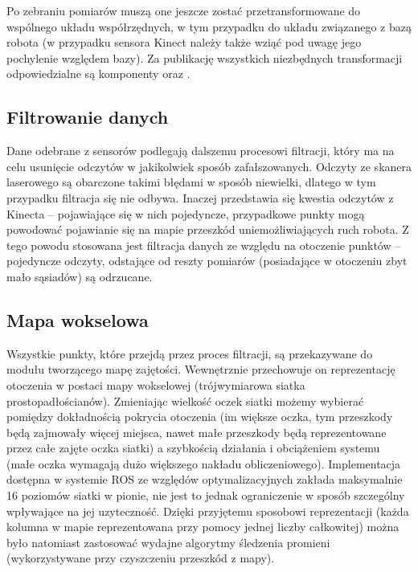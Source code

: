 Po zebraniu pomiarów muszą one jeszcze zostać przetransformowane do wspólnego
układu współrzędnych, w tym przypadku do układu związanego z bazą robota (w
przypadku sensora Kinect należy także wziąć pod uwagę jego pochylenie względem
bazy). Za publikację wszystkich niezbędnych transformacji  odpowiedzialne są
komponenty  oraz .

\subsection{Filtrowanie danych}

Dane odebrane z sensorów podlegają dalszemu procesowi filtracji, który ma na
celu usunięcie odczytów w jakikolwiek sposób zafałszowanych. Odczyty ze skanera
laserowego są obarczone takimi błędami w sposób niewielki, dlatego w tym
przypadku filtracja się nie odbywa. Inaczej przedstawia się kwestia odczytów z
Kinecta -- pojawiające się w nich pojedyncze, przypadkowe punkty mogą powodować
pojawianie się na mapie przeszkód uniemożliwiających ruch robota. Z tego powodu
stosowana jest filtracja danych ze względu na otoczenie punktów -- pojedyncze
odczyty, odstające od reszty pomiarów (posiadające w otoczeniu zbyt mało
sąsiadów) są odrzucane.

\subsection{Mapa wokselowa}

Wszystkie punkty, które przejdą przez proces filtracji, są przekazywane do
modułu tworzącego mapę zajętości. Wewnętrznie przechowuje on reprezentację
otoczenia w postaci mapy wokselowej (trójwymiarowa siatka prostopadłościanów).
Zmieniając wielkość oczek siatki możemy wybierać pomiędzy dokładnością pokrycia
otoczenia (im większe oczka, tym przeszkody będą zajmowały więcej miejsca, nawet małe
przeszkody będą reprezentowane przez całe zajęte oczka siatki) a szybkością
działania i obciążeniem systemu (małe oczka wymagają dużo większego nakładu
obliczeniowego). Implementacja dostępna w systemie ROS ze względów
optymalizacyjnych zakłada maksymalnie 16 poziomów siatki w pionie, nie jest to
jednak ograniczenie w sposób szczególny wpływające na jej uzyteczność. Dzięki
przyjętemu sposobowi reprezentacji (każda kolumna w mapie reprezentowana przy
pomocy jednej liczby całkowitej) można było natomiast zastosować wydajne
algorytmy śledzenia promieni (wykorzystywane przy czyszczeniu przeszkód z mapy).

